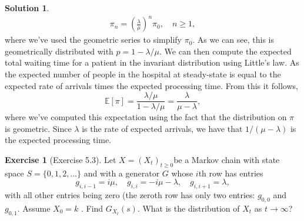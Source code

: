 \documentclass[12pt]{article}
\newcommand{\Expect}{\mathbb{E}}
\theoremstyle{definition}
\newtheorem{exer}{Exercise}
\newtheorem{sol}{Solution}
\theoremstyle{remark}
\begin{document}
\begin{sol}
\begin{align*}
    \pi_{n} = \left(\frac{\lambda}{\mu}\right)^{n} \pi_{0}, \quad n\geq 1,
\end{align*}
where we've used the geometric series to simplify $\pi_{0}$. As we can see, this is geometrically distributed with $p = 1 - \lambda / \mu$. We can then compute the expected total waiting time for a patient in the invariant distribution using Little's law. As the expected number of people in the hospital at steady-state is equal to the expected rate of arrivals times the expected processing time. From this it follows,
\begin{equation*}
    \Expect[\pi] = \frac{\lambda / \mu}{1 - \lambda / \mu} = \frac{\lambda}{ \mu - \lambda },
\end{equation*}
where we've computed this expectation using the fact that the distribution on $\pi$ is geometric. Since $\lambda$ is the rate of expected arrivals, we have that  $1 / (\mu - \lambda)$ is the expected processing time.
\end{sol}

  \newpage

\begin{exer}[Exercise 5.3]
    Let $X = (X_{t})_{t\geq 0}$be a Markov chain with state space $S = \{0, 1, 2, \ldots \}$ and with a generator $G$ whose $i$th row has entries
    \begin{equation*}
   g_{i,i-1} = i\mu, \quad g_{i,i} = -i\mu - \lambda,\quad  g_{i,i+1} = \lambda, 
    \end{equation*}
with all other entries being zero (the zeroth row has only two entries: $g_{0,0}$ and $g_{0,1}$. Assume $X_{0} = k$ .
Find $G_{X_{t}}(s)$. What is the distribution of $X_{t}$ as $t \to \infty$?
\end{exer}
\end{document}
